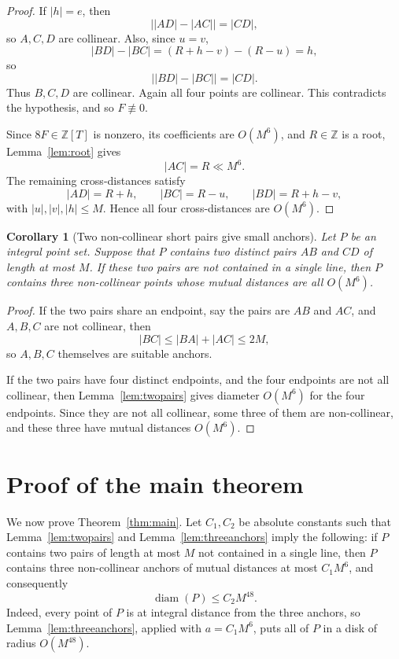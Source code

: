 \documentclass[11pt]{article}
\newtheorem{corollary}[theorem]{Corollary}
\newcommand{\diam}{\operatorname{diam}}
\newcommand{\ZZ}{\mathbb Z}
\begin{document}
\begin{proof}
If \(|h|=e\), then
\[
        \bigl||AD|-|AC|\bigr|=|CD|,
\]
so \(A,C,D\) are collinear.  Also, since \(u=v\),
\[
        |BD|-|BC|=(R+h-v)-(R-u)=h,
\]
so
\[
        \bigl||BD|-|BC|\bigr|=|CD|.
\]
Thus \(B,C,D\) are collinear.  Again all four points are collinear.  This
contradicts the hypothesis, and so \(F\not\equiv0\).

Since \(8F\in\ZZ[T]\) is nonzero, its coefficients are \(O(M^6)\), and
\(R\in\ZZ\) is a root, Lemma~\ref{lem:root} gives
\[
        |AC|=R\ll M^6.
\]
The remaining cross-distances satisfy
\[
        |AD|=R+h,
        \qquad |BC|=R-u,
        \qquad |BD|=R+h-v,
\]
with \(|u|,|v|,|h|\le M\).  Hence all four cross-distances are \(O(M^6)\).
\end{proof}

\begin{corollary}[Two non-collinear short pairs give small anchors]\label{cor:smallanchors}
Let \(P\) be an integral point set.  Suppose that \(P\) contains two distinct
pairs \(AB\) and \(CD\) of length at most \(M\).  If these two pairs are not
contained in a single line, then \(P\) contains three non-collinear points whose
mutual distances are all \(O(M^6)\).
\end{corollary}

\begin{proof}
If the two pairs share an endpoint, say the pairs are \(AB\) and \(AC\), and
\(A,B,C\) are not collinear, then
\[
        |BC|\le |BA|+|AC|\le 2M,
\]
so \(A,B,C\) themselves are suitable anchors.

If the two pairs have four distinct endpoints, and the four endpoints are not
all collinear, then Lemma~\ref{lem:twopairs} gives diameter \(O(M^6)\) for the
four endpoints.  Since they are not all collinear, some three of them are
non-collinear, and these three have mutual distances \(O(M^6)\).
\end{proof}

\section{Proof of the main theorem}

We now prove Theorem~\ref{thm:main}.  Let \(C_1,C_2\) be absolute constants such
that Lemma~\ref{lem:twopairs} and Lemma~\ref{lem:threeanchors} imply the
following: if \(P\) contains two pairs of length at most \(M\) not contained in a
single line, then \(P\) contains three non-collinear anchors of mutual distances
at most \(C_1M^6\), and consequently
\[
        \diam(P)\le C_2M^{48}.          \tag{4.1}
\]
Indeed, every point of \(P\) is at integral distance from the three anchors, so
Lemma~\ref{lem:threeanchors}, applied with \(a=C_1M^6\), puts all of \(P\) in a
disk of radius \(O(M^{48})\).
\end{document}
